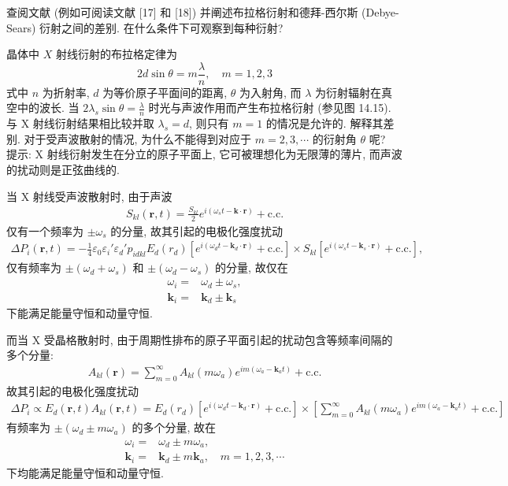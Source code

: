 \documentclass{note}
\begin{document}
\begin{exe}
    查阅文献 (例如可阅读文献 [17] 和 [18]) 并阐述布拉格衍射和德拜-西尔斯 (Debye-Sears) 衍射之间的差别. 在什么条件下可观察到每种衍射?
\end{exe}
\begin{sol}
    
\end{sol}

\begin{exe}
    晶体中 $X$ 射线衍射的布拉格定律为
    \[
        2d\sin\theta=m\frac{\lambda}{n},\quad m=1,2,3
    \]
    式中 $n$ 为折射率, $d$ 为等价原子平面间的距离, $\theta$ 为入射角, 而 $\lambda$ 为衍射辐射在真空中的波长. 当 $2\lambda_s\sin\theta=\frac{\lambda}{n}$ 时光与声波作用而产生布拉格衍射 (参见图 14.15). 与 X 射线衍射结果相比较并取 $\lambda_s=d$, 则只有 $m=1$ 的情况是允许的. 解释其差别. 对于受声波散射的情况, 为什么不能得到对应于 $m=2,3,\cdots$ 的衍射角 $\theta$ 呢?\\
    提示: X 射线衍射发生在分立的原子平面上, 它可被理想化为无限薄的薄片, 而声波的扰动则是正弦曲线的.
\end{exe}
\begin{sol}
    当 X 射线受声波散射时, 由于声波
    \begin{align}
        S_{kl}(\bm{r},t)=\frac{S_{kl}}{2}e^{i(\omega_st-\bm{k}\cdot\bm{r})}+\text{c.c.}
    \end{align}
    仅有一个频率为 $\pm\omega_s$ 的分量, 故其引起的电极化强度扰动
    \begin{align}
        \Delta P_i(\bm{r},t)=-\frac{1}{4}\varepsilon_0\varepsilon_i'\varepsilon_d'p_{idkl}E_d(r_d)[e^{i(\omega_dt-\bm{k}_d\cdot\bm{r})}+\text{c.c.}]\times S_{kl}[e^{i(\omega_st-\bm{k}_s\cdot\bm{r})}+\text{c.c.}],
    \end{align}
    仅有频率为 $\pm(\omega_d+\omega_s)$ 和 $\pm(\omega_d-\omega_s)$ 的分量, 故仅在
    \begin{align}
        \omega_i=&\omega_d\pm\omega_s,\\
        \bm{k}_i=&\bm{k}_d\pm\bm{k}_s
    \end{align}
    下能满足能量守恒和动量守恒.

    而当 X 受晶格散射时, 由于周期性排布的原子平面引起的扰动包含等频率间隔的多个分量:
    \begin{align}
        A_{kl}(\bm{r})=\sum_{m=0}^{\infty}A_{kl}(m\omega_a)e^{im(\omega_a-\bm{k}_at)}+\text{c.c.}
    \end{align}
    故其引起的电极化强度扰动
    \begin{align}
        \Delta P_i\propto E_d(\bm{r},t)A_{kl}(\bm{r},t)=E_d(r_d)[e^{i(\omega_dt-\bm{k}_d\cdot\bm{r})}+\text{c.c.}]\times\left[\sum_{m=0}^{\infty}A_{kl}(m\omega_a)e^{im(\omega_a-\bm{k}_at)}+\text{c.c.}\right]
    \end{align}
    有频率为 $\pm(\omega_d\pm m\omega_a)$ 的多个分量, 故在
    \begin{align}
        \omega_i=&\omega_d\pm m\omega_a,\\
        \bm{k}_i=&\bm{k}_d\pm m\bm{k}_a,\quad m=1,2,3,\cdots
    \end{align}
    下均能满足能量守恒和动量守恒.
\end{sol}
\end{document}

